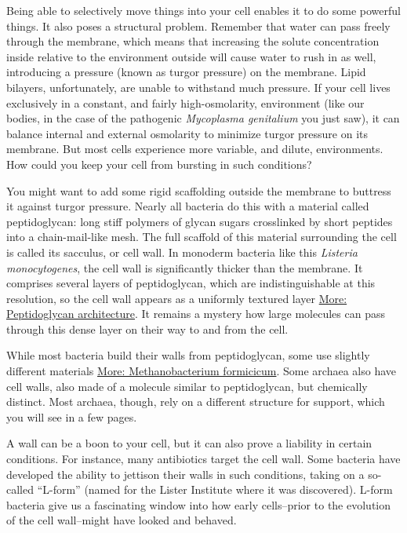 \documentclass[]{tufte-book}
\begin{document}
Being able to selectively move things into your cell enables it to do
some powerful things. It also poses a structural problem. Remember that
water can pass freely through the membrane, which means that increasing
the solute concentration inside relative to the environment outside will
cause water to rush in as well, introducing a pressure (known as turgor
pressure) on the membrane. Lipid bilayers, unfortunately, are unable to
withstand much pressure. If your cell lives exclusively in a constant,
and fairly high-osmolarity, environment (like our bodies, in the case of
the pathogenic \emph{Mycoplasma genitalium} you just saw), it can
balance internal and external osmolarity to minimize turgor pressure on
its membrane. But most cells experience more variable, and dilute,
environments. How could you keep your cell from bursting in such
conditions?

You might want to add some rigid scaffolding outside the membrane to
buttress it against turgor pressure. Nearly all bacteria do this with a
material called peptidoglycan: long stiff polymers of glycan sugars
crosslinked by short peptides into a chain-mail-like mesh. The full
scaffold of this material surrounding the cell is called its sacculus,
or cell wall. In monoderm bacteria like this \emph{Listeria
monocytogenes}, the cell wall is significantly thicker than the
membrane. It comprises several layers of peptidoglycan, which are
indistinguishable at this resolution, so the cell wall appears as a
uniformly textured layer
\protect\hyperlink{Peptidoglycan_architecture}{More: Peptidoglycan
architecture}. It remains a mystery how large molecules can pass through
this dense layer on their way to and from the cell.

While most bacteria build their walls from peptidoglycan, some use
slightly different materials
\protect\hyperlink{Methanobacterium_formicicum}{More: Methanobacterium
formicicum}. Some archaea also have cell walls, also made of a molecule
similar to peptidoglycan, but chemically distinct. Most archaea, though,
rely on a different structure for support, which you will see in a few
pages.

A wall can be a boon to your cell, but it can also prove a liability in
certain conditions. For instance, many antibiotics target the cell wall.
Some bacteria have developed the ability to jettison their walls in such
conditions, taking on a so-called ``L-form'' (named for the Lister
Institute where it was discovered). L-form bacteria give us a
fascinating window into how early cells--prior to the evolution of the
cell wall--might have looked and behaved.
\end{document}
